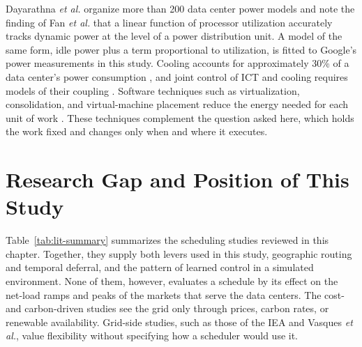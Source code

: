\documentclass{UNCC-thesis}
\begin{document}
Dayarathna \emph{et al.} \cite{dayarathna2016survey} organize more than 200 data center power
models and note the finding of Fan \emph{et al.} that a linear function of processor utilization
accurately tracks dynamic power at the level of a power distribution unit. A model of the same
form, idle power plus a term proportional to utilization, is fitted to Google's power
measurements in this study.
Cooling accounts for approximately 30\% of a data center's power consumption
\cite{zhang2021cooling}, and joint control of ICT and cooling requires models of their coupling
\cite{zhang2016joint}. Software techniques such as virtualization, consolidation, and
virtual-machine placement reduce the energy needed for each unit of work
\cite{katal2023energy,panwar2022systematic}. These techniques complement the question asked here,
which holds the work fixed and changes only when and where it executes.

\section{Research Gap and Position of This Study}
\label{sec:lit-gap}

Table~\ref{tab:lit-summary} summarizes the scheduling studies reviewed in this chapter. Together,
they supply both levers used in this study, geographic routing and temporal deferral, and the
pattern of learned control in a simulated environment. None of them, however, evaluates a
schedule by its effect on the net-load ramps and peaks of the markets that serve the data
centers. The cost- and carbon-driven studies see the grid only through prices, carbon rates, or
renewable availability. Grid-side studies, such as those of the IEA and Vasques \emph{et al.},
value flexibility without specifying how a scheduler would use it.
\end{document}
